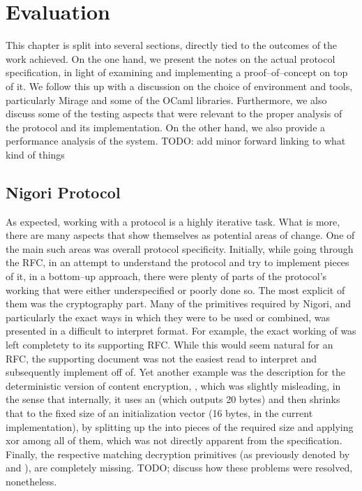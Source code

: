 \chapter{Evaluation} \label{chapter:evaluation}
This chapter is split into several sections, directly tied to the outcomes of the work achieved.
On the one hand, we present the notes on the actual protocol specification, in light of examining and implementing a proof--of--concept on top of it.
We follow this up with a discussion on the choice of environment and tools, particularly Mirage and some of the OCaml libraries.
Furthermore, we also discuss some of the testing aspects that were relevant to the proper analysis of the protocol and its implementation.
On the other hand, we also provide a performance analysis of the system. TODO: add minor forward linking to what kind of things

\section{Nigori Protocol} \label{sec:evaluation:protocol}
As expected, working with a \wip protocol is a highly iterative task.
What is more, there are many aspects that show themselves as potential areas of change.
One of the main such areas was overall protocol specificity.
Initially, while going through the RFC, in an attempt to understand the protocol and try to implement pieces of it, in a bottom--up approach, there were plenty of parts of the protocol's working that were either underspecified or poorly done so.
The most explicit of them was the cryptography part.
Many of the primitives required by Nigori, and particularly the exact ways in which they were to be used or combined, was presented in a difficult to interpret format.
For example, the exact working of  was left completety to its supporting RFC.
While this would seem natural for an RFC, the supporting document was not the easiest read to interpret and subsequently implement off of.
Yet another example was the description for the deterministic version of content encryption, , which was slightly misleading, in the sense that internally, it uses an  (which outputs 20 bytes) and then shrinks that to the fixed size of an  initialization vector (16 bytes, in the current implementation), by splitting up the  into pieces of the required size and applying xor among all of them, which was not directly apparent from the specification.
Finally, the respective matching decryption primitives (as previously denoted by  and ), are completely missing.
TODO; discuss how these problems were resolved, nonetheless.

